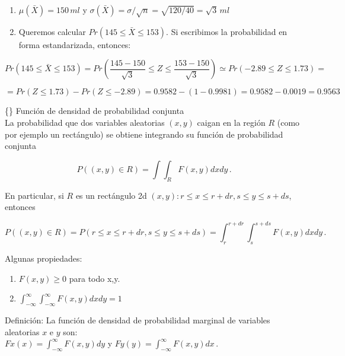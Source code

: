 \documentclass[
]{agujournal2019}
\providecommand{\tightlist}{%
  \setlength{\itemsep}{0pt}\setlength{\parskip}{0pt}}\usepackage{longtable,booktabs,array}
\begin{document}
\begin{enumerate}
\def\labelenumi{(\alph{enumi})}
\tightlist
\item
  \(\mu(\bar{X})=150\,{ ml}\) y
  \(\sigma(\bar{X})=\sigma/\sqrt{n}=\sqrt{120/40}= \sqrt{3}\,{ ml}\)\\
\item
  Queremos calcular \(Pr(145 \le \bar{X} \le 153)\). Si escribimos la
  probabilidad en forma estandarizada, entonces:
\end{enumerate}

\[Pr(145 \le \bar{X} \le 153) =
      Pr\left( \frac{145-150}{\sqrt{3}} \le Z \le \frac{153-150}{\sqrt{3}}\right)
       \simeq Pr(-2.89 \le Z \le 1.73)=\]

\[=Pr(Z \le 1.73)- Pr(Z \le -2.89)=0.9582-(1-0.9981)=0.9582-0.0019=0.9563\]

\vspace{0.5cm}

\{\noindent\} Función de densidad de probabilidad conjunta\\

La probabilidad que dos variables aleatorias \((x,y)\) caigan en la
región \(R\) (como por ejemplo un rectángulo) se obtiene integrando su
función de probabilidad conjunta

\[P((x,y)\in R)=\int\int_{R} F(x,y) dx dy\,.\]

En particular, si \(R\) es un rectángulo 2d
\({(x,y):r\le x \le r+dr, s \le y \le s+ds}\), entonces

\[P((x,y)\in R)=P(r\le x \le r+dr, s \le y \le s+ds)=\int^{r+dr}_r\int^{s+ds}_{s} F(x,y) dx dy\,.\]

Algunas propiedades:\\

\begin{enumerate}
\def\labelenumi{(\arabic{enumi})}
\tightlist
\item
  \(F(x,y)\ge0\) para todo x,y.\\
\item
  \(\int^{\infty}_{-\infty}\int^{\infty}_{-\infty} F(x,y) dx dy=1\)\\
\end{enumerate}

Definición: La función de densidad de probabilidad marginal de variables
aleatorias \(x\) e \(y\) son:\\
\(Fx(x)=\int^{\infty}_{-\infty} F(x,y)dy\) y
\(Fy(y)=\int^{\infty}_{-\infty} F(x,y)dx\,.\)

\vspace{0.5cm}
\end{document}
